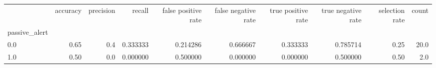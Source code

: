 \begin{tabular}{lrrrrrrrrr}
\toprule
{} &  accuracy &  precision &    recall &  false positive rate &  false negative rate &  true positive rate &  true negative rate &  selection rate &  count \\
passive\_alert &           &            &           &                      &                      &                     &                     &                 &        \\
\midrule
0.0           &      0.65 &        0.4 &  0.333333 &             0.214286 &             0.666667 &            0.333333 &            0.785714 &            0.25 &   20.0 \\
1.0           &      0.50 &        0.0 &  0.000000 &             0.500000 &             0.000000 &            0.000000 &            0.500000 &            0.50 &    2.0 \\
\bottomrule
\end{tabular}
